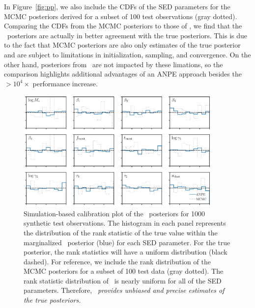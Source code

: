In Figure~\ref{fig:pp}, we also include the CDFs of the SED parameters for the
MCMC posteriors derived for a subset of 100 test observations (gray dotted). 
Comparing the CDFs from the MCMC posteriors to those of \sedflow, we find that
the \sedflow~posteriors are actually in better agreement with the true
posteriors. 
This is due to the fact that MCMC posteriors are also only estimates of the
true posterior and are subject to limitations in initialization, sampling, and
convergence.
On the other hand, posteriors from \sedflow~are not impacted by these
limations, so the comparison highlights additional advantages of an ANPE
approach besides the ${>}10^4\times$ performance increase.

\begin{figure}
\begin{center}
    \includegraphics[width=0.9\textwidth]{figs/sbc.pdf}
    \caption{\label{fig:sbc}
    Simulation-based calibration plot of the \sedflow~posteriors for 1000
    synthetic test observations. 
    The histogram in each panel represents the distribution of the rank
    statistic of the true value within the marginalized \sedflow~posterior
    (blue) for each SED parameter.
    For the true posterior, the rank statistics will have a uniform
    distribution (black dashed). 
    For reference, we include the rank distribution of the MCMC posteriors for
    a subset of 100 test data (gray dotted). 
    The rank statistic distribution of \sedflow~is nearly uniform for all of
    the SED parameters. 
    Therefore, \emph{\sedflow~provides unbiased and precise estimates of the
    true posteriors.}
    }
\end{center}
\end{figure}

